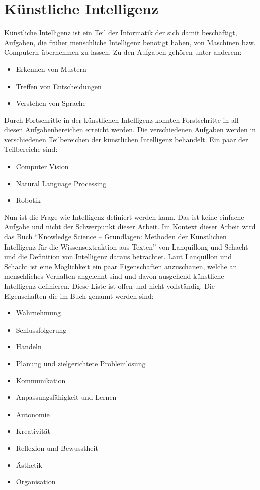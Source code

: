 \section{Künstliche Intelligenz}
\label{s:intro:ki}
Künstliche Intelligenz ist ein Teil der Informatik der sich damit beschäftigt, Aufgaben, die früher 
menschliche Intelligenz benötigt haben, von Maschinen bzw. Computern übernehmen zu lassen. 
Zu den Aufgaben gehören unter anderem:
\begin{itemize}
    \item Erkennen von Mustern
    \item Treffen von Entscheidungen
    \item Verstehen von Sprache
\end{itemize}
Durch Fortschritte in der künstlichen Intelligenz konnten Forstschritte in all diesen Aufgabenbereichen erreicht werden.
Die verschiedenen Aufgaben werden in verschiedenen Teilbereichen der künstlichen Intelligenz behandelt. Ein paar der Teilbereiche sind:
\begin{itemize}
    \item Computer Vision
    \item Natural Language Processing
    \item Robotik
\end{itemize}
Nun ist die Frage wie Intelligenz definiert werden kann.
Das ist keine einfache Aufgabe und nicht der Schwerpunkt dieser 
Arbeit. Im Kontext dieser Arbeit wird das Buch ``Knowledge Science – 
Grundlagen: Methoden der Künstlichen Intelligenz für die 
Wissensextraktion aus Texten'' von Lanquillong und Schacht
 und die Definition von Intelligenz daraus betrachtet. Laut Lanquillon und Schacht ist eine Möglichkeit
ein paar Eigenschaften anzuschauen, welche an menschliches Verhalten 
angelehnt sind und davon ausgehend künstliche Intelligenz 
definieren. Diese Liste ist offen und nicht vollständig. 
Die Eigenschaften die im Buch genannt werden sind: 
\begin{itemize}
    \item Wahrnehmung
    \item Schlussfolgerung
    \item Handeln
    \item Planung und zielgerichtete Problemlösung
    \item Kommunikation
    \item Anpassungsfähigkeit und Lernen
    \item Autonomie
    \item Kreativität
    \item Reflexion und Bewusstheit
    \item Ästhetik
    \item Organisation
\end{itemize}
